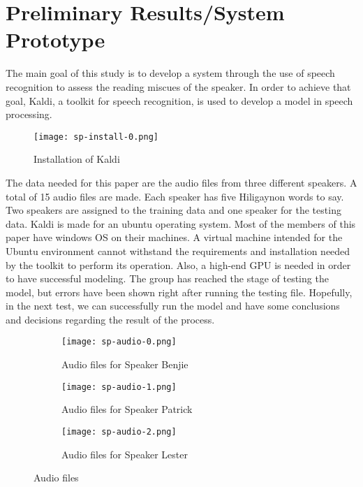 \chapter{Preliminary Results/System Prototype}
The main goal of this study is to develop a system through the use of speech recognition to assess the reading miscues of the speaker. In order to achieve that goal, Kaldi, a toolkit for speech recognition, is used to develop a model in speech processing. 

\begin{figure}
    \texttt{[image: sp-install-0.png]}
    \caption{Installation of Kaldi}
    \label{fig:1}
  \end{figure}

The data needed for this paper are the audio files from three different speakers. A total of 15 audio files are made. Each speaker has five Hiligaynon words to say. Two speakers are assigned to the training data and one speaker for the testing data.
Kaldi is made for an ubuntu operating system. Most of the members of this paper have windows OS on their machines. A virtual machine intended for the Ubuntu environment cannot withstand the requirements and installation needed by the toolkit to perform its operation. Also, a high-end GPU is needed in order to have successful modeling. The group has reached the stage of testing the model, but errors have been shown right after running the testing file. Hopefully, in the next test, we can successfully run the model and have some conclusions and decisions regarding the result of the process.

\begin{figure}
	\centering
	\begin{subfigure}[b]{0.3\textwidth}
		\centering
		\texttt{[image: sp-audio-0.png]}
		\caption{Audio files for Speaker Benjie}
		\label{fig:y equals x}
	\end{subfigure}
	\hfill
	\begin{subfigure}[b]{0.3\textwidth}
		\centering
		\texttt{[image: sp-audio-1.png]}
		\caption{Audio files for Speaker Patrick}
		\label{fig:three sin x}
	\end{subfigure}
	\hfill
	\begin{subfigure}[b]{0.3\textwidth}
		\centering
		\texttt{[image: sp-audio-2.png]}
		\caption{Audio files for Speaker Lester}
		\label{fig:five over x}
	\end{subfigure}
	\caption{Audio files}
	\label{fig:audio-files}
\end{figure}